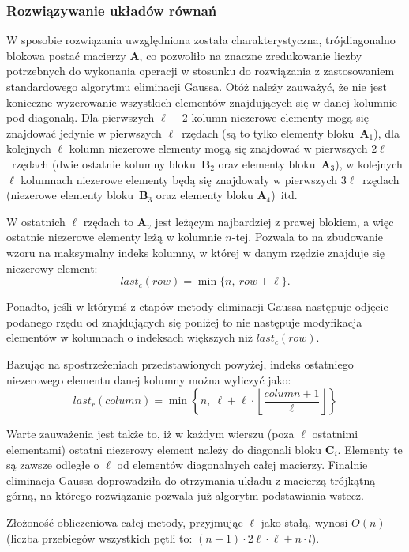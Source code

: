 \documentclass{classrep}
\newcommand{\mA}{\bm{A}}
\newcommand{\mB}{\bm{B}}
\newcommand{\mC}{\bm{C}}
\begin{document}
		\subsubsection{Rozwiązywanie układów równań}
			W sposobie rozwiązania uwzględniona została charakterystyczna, trójdiagonalno blokowa postać macierzy $\mA$, co pozwoliło na znaczne zredukowanie liczby potrzebnych do wykonania operacji w stosunku do rozwiązania z zastosowaniem standardowego algorytmu eliminacji Gaussa. Otóż należy zauważyć, że nie jest konieczne wyzerowanie wszystkich elementów znajdujących się w danej kolumnie pod diagonalą. Dla pierwszych $\ell-2$ kolumn niezerowe elementy mogą się znajdować jedynie w pierwszych $\ell$~rzędach (są to tylko elementy bloku~$\mA_1$), dla kolejnych $\ell$ kolumn  niezerowe elementy mogą się znajdować w pierwszych $2\ell$~rzędach (dwie ostatnie kolumny bloku~$\mB_2$ oraz elementy bloku~$\mA_3$), w kolejnych $\ell$ kolumnach niezerowe elementy będą się znajdowały w pierwszych $3\ell$~rzędach (niezerowe elementy bloku~$\mB_3$ oraz elementy bloku $\mA_4$)~itd.
			
	W ostatnich $\ell$ rzędach to $\mA_v$ jest leżącym najbardziej z prawej blokiem, a więc ostatnie niezerowe elementy leżą w kolumnie $n$-tej.
	Pozwala to na zbudowanie wzoru na maksymalny indeks kolumny, w której w danym rzędzie znajduje się niezerowy element:
	$$
	last_c(row) = \min\{n,~row + \ell\}.
	$$
	
	Ponadto, jeśli w którymś z etapów metody eliminacji Gaussa następuje odjęcie podanego rzędu od znajdujących się poniżej to nie następuje modyfikacja elementów w kolumnach o indeksach większych niż $last_c(row)$.
	
	Bazując na spostrzeżeniach przedstawionych powyżej, indeks ostatniego niezerowego elementu danej kolumny można wyliczyć jako:
	$$
	last_r(column) = \min\left\lbrace n,~\ell + \ell \cdot \left \lfloor\frac{column + 1}{\ell}\right \rfloor\right\rbrace
	$$
	
	Warte zauważenia jest także to, iż w każdym wierszu (poza $\ell$ ostatnimi elementami) ostatni niezerowy element należy do diagonali bloku $\mC_i$. Elementy te są zawsze odległe o $\ell$ od elementów diagonalnych całej macierzy. Finalnie eliminacja Gaussa doprowadziła do otrzymania układu z macierzą trójkątną górną, na którego rozwiązanie pozwala już algorytm podstawiania wstecz.
	
	Złożoność obliczeniowa całej metody, przyjmując $\ell$ jako stałą, wynosi $O(n)$ (liczba przebiegów wszystkich pętli to: $(n-1) \cdot 2\ell \cdot \ell + n \cdot l$).
	
\end{document}
